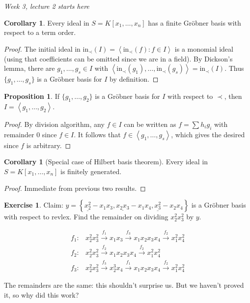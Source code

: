 \documentclass[a4paper]{article}
\newcommand{\la}{\left\langle}
\newcommand{\ra}{\right\rangle}
\newcommand{\In}{\text{in}}
\theoremstyle{definition}
\newtheorem{prop}[defn]{Proposition}
\newtheorem{coro}[defn]{Corollary}
\newtheorem{exe}[defn]{Exercise}
\begin{document}
\begin{flushright}
\textit{Week 3, lecture 2 starts here}
\end{flushright}

\begin{coro}
Every ideal in $S=K[x_1,\ldots,x_n]$ has a finite Gröbner basis with respect to a term order.
\end{coro}
\begin{proof}
The initial ideal in $\In_\prec(I)=\la \In_\prec(f):f\in I\ra$ is a monomial ideal (using that coefficients can be omitted since we are in a field). By Dickson's lemma, there are $g_1,\ldots,g_s\in I$ with $\la \In_\prec(g_1),\ldots,\In_\prec(g_s)\ra=\In_\prec(I)$. Thus $\{g_1,\ldots,g_s\}$ is a Gröbner basis for $I$ by definition.
\end{proof}

\begin{prop}
If $\{g_1,\ldots,g_2\}$ is a Gröbner basis for $I$ with respect to $\prec$, then $I=\la g_1,\ldots,g_2\ra$.
\end{prop}
\begin{proof}
By division algorithm, any $f\in I$ can be written as $f=\sum h_i g_i$ with remainder 0 since $f\in I$. It follows that $f\in\la g_1,\ldots,g_s\ra$, which gives the desired since $f$ is arbitrary.
\end{proof}

\begin{coro}[Special case of Hilbert basis theorem]
Every ideal in $S=K[x_1,\ldots,x_n]$ is finitely generated.
\end{coro}
\begin{proof}
Immediate from previous two results.
\end{proof}
\begin{exe}
Claim: $y=\left\{\underline{x_2^2}-x_1x_3,\underline{x_2x_3}-x_1x_4,\underline{x_3^2}-x_2x_4\right\}$ is a Gröbner basis with respect to revlex. Find the remainder on dividing $x_2^2x_3^2$ by $y$.

\[
\begin{aligned}
f_1:& x_2^2x_3^2 \xrightarrow{f_1} x_1x_3\xrightarrow{f_3}x_1x_2x_3x_4\xrightarrow{f_2}x_1^2x_4^2 \\
f_2:& x_2^2x_3^2 \xrightarrow{f_2} x_1x_2x_3x_4\xrightarrow{f_2} x_1^2x_4^2 \\
f_3:& x_2^2x_3^2 \xrightarrow{f_3}x_2^3x_4\xrightarrow{f_1}x_1x_2x_3x_4\xrightarrow{f_2}x_1^2x_4^2
\end{aligned}
\]

The remainders are the same: this shouldn't surprise us. But we haven't proved it, so why did this work?
\end{exe}
\end{document}
